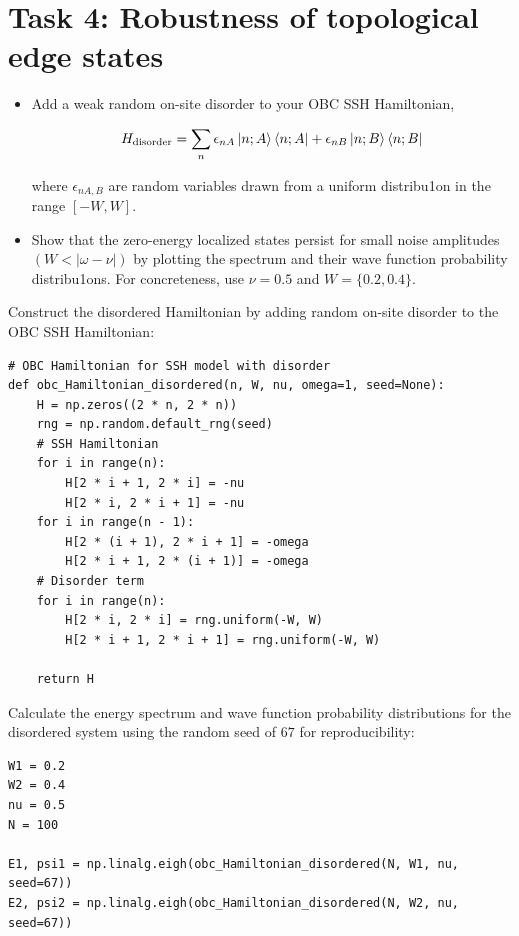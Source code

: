 \documentclass{report}
\begin{document}
\section{Task 4: Robustness of topological edge states}
\setcounter{tcb@cnt@question}{0}

\begin{question}{}{}
    \begin{itemize}
        \item Add a weak random on-site disorder to your OBC SSH Hamiltonian,

            $$
            H_\text{disorder} = \sum_n \epsilon_{nA} \ket{n; A}\bra{n; A} + \epsilon_{nB} \ket{n; B}\bra{n; B}
            $$

            where $\epsilon_{nA, B}$ are random variables drawn from a uniform distribu1on in the range $[-W,W]$. 

        \item Show that the zero-energy localized states persist for small noise amplitudes $(W < |\omega - \nu|)$ by plotting the spectrum and their wave function probability distribu1ons. For concreteness, use $\nu = 0.5$ and $W = \{0.2,0.4\}$.
    \end{itemize}
\end{question}

\sol Construct the disordered Hamiltonian by adding random on-site disorder to the OBC SSH Hamiltonian:

\begin{lstlisting}
# OBC Hamiltonian for SSH model with disorder
def obc_Hamiltonian_disordered(n, W, nu, omega=1, seed=None):
    H = np.zeros((2 * n, 2 * n))
    rng = np.random.default_rng(seed)
    # SSH Hamiltonian
    for i in range(n):
        H[2 * i + 1, 2 * i] = -nu
        H[2 * i, 2 * i + 1] = -nu
    for i in range(n - 1):
        H[2 * (i + 1), 2 * i + 1] = -omega
        H[2 * i + 1, 2 * (i + 1)] = -omega
    # Disorder term
    for i in range(n):
        H[2 * i, 2 * i] = rng.uniform(-W, W)
        H[2 * i + 1, 2 * i + 1] = rng.uniform(-W, W)

    return H
\end{lstlisting}

Calculate the energy spectrum and wave function probability distributions for the disordered system using the random seed of $67$ for reproducibility:

\begin{lstlisting}
W1 = 0.2
W2 = 0.4
nu = 0.5
N = 100

E1, psi1 = np.linalg.eigh(obc_Hamiltonian_disordered(N, W1, nu, seed=67))
E2, psi2 = np.linalg.eigh(obc_Hamiltonian_disordered(N, W2, nu, seed=67))
\end{lstlisting}
\end{document}
